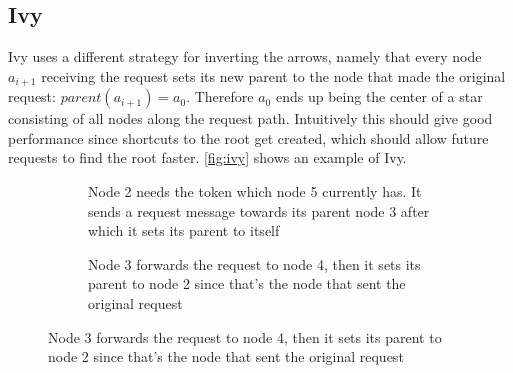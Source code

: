 \documentclass[a4paper, oneside]{discothesis}
\begin{document}
\subsection{Ivy}
\label{intro:ivy}

Ivy uses a different strategy for inverting the arrows, namely that every node $a_{i+1}$ receiving the request sets its new parent to the node that made the original request: $parent(a_{i+1})=a_{0}$. Therefore $a_{0}$ ends up being the center of a star consisting of all nodes along the request path. Intuitively this should give good performance since shortcuts to the root get created, which should allow future requests to find the root faster. \autoref{fig:ivy} shows an example of Ivy.

\begin{figure}[H]
\begin{subfigure}[t]{0.5\textwidth}
\centering
{}
\caption{Node 2 needs the token which node 5 currently has. It sends a request message towards its parent node 3 after which it sets its parent to itself}
\end{subfigure}
\quad
\begin{subfigure}[t]{0.5\textwidth}
\centering
{}
\caption{Node 3 forwards the request to node 4, then it sets its parent to node 2 since that's the node that sent the original request}
\end{subfigure}
\end{figure}
\end{document}
